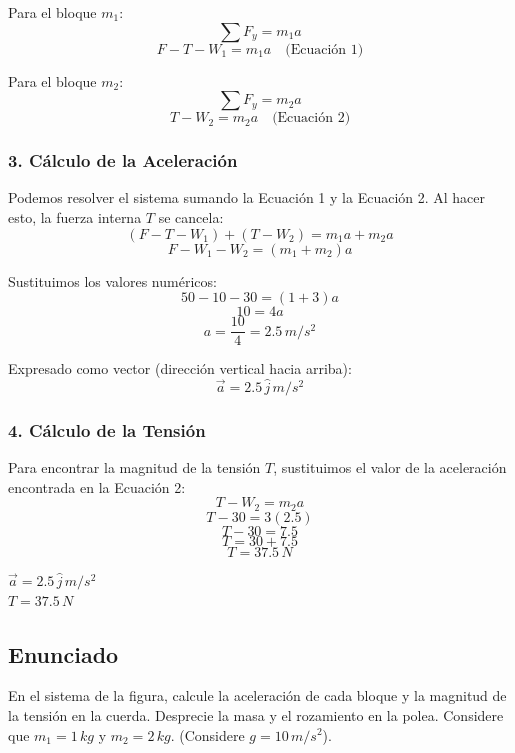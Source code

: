 \documentclass[12pt, a4paper]{article}
\begin{document}
Para el bloque $m_1$:
$$ \sum F_y = m_1 a $$
$$ F - T - W_1 = m_1 a \quad \text{(Ecuación 1)} $$

Para el bloque $m_2$:
$$ \sum F_y = m_2 a $$
$$ T - W_2 = m_2 a \quad \text{(Ecuación 2)} $$

\subsubsection*{3. Cálculo de la Aceleración}
Podemos resolver el sistema sumando la Ecuación 1 y la Ecuación 2. Al hacer esto, la fuerza interna $T$ se cancela:
$$ (F - T - W_1) + (T - W_2) = m_1 a + m_2 a $$
$$ F - W_1 - W_2 = (m_1 + m_2) a $$

Sustituimos los valores numéricos:
$$ 50 - 10 - 30 = (1 + 3) a $$
$$ 10 = 4 a $$
$$ a = \frac{10}{4} = 2.5 \, \si{m/s^2} $$

Expresado como vector (dirección vertical hacia arriba):
$$ \vec{a} = 2.5 \, \hat{j} \, \si{m/s^2} $$

\subsubsection*{4. Cálculo de la Tensión}
Para encontrar la magnitud de la tensión $T$, sustituimos el valor de la aceleración encontrada en la Ecuación 2:
$$ T - W_2 = m_2 a $$
$$ T - 30 = 3(2.5) $$
$$ T - 30 = 7.5 $$
$$ T = 30 + 7.5 $$
$$ T = 37.5 \, \si{N} $$

\begin{tcolorbox}[colback=green!5!white, colframe=green!50!black, title=Respuesta Final]
\centering
$\vec{a} = 2.5 \, \hat{j} \, \si{m/s^2}$ \\
$T = 37.5 \, \si{N}$
\end{tcolorbox}

\newpage

\subsection*{Enunciado}
En el sistema de la figura, calcule la aceleración de cada bloque y la magnitud de la tensión en la cuerda. Desprecie la masa y el rozamiento en la polea. Considere que $m_1 = 1 \, \si{kg}$ y $m_2 = 2 \, \si{kg}$. (Considere $g = 10 \, \si{m/s^2}$).
\end{document}
